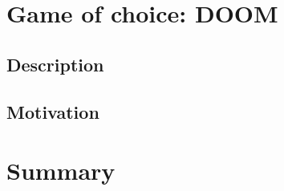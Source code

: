 \section{Game of choice: DOOM}
\label{sec:doominfo}
\subsection{Description}
\subsection{Motivation}



\section{Summary}
